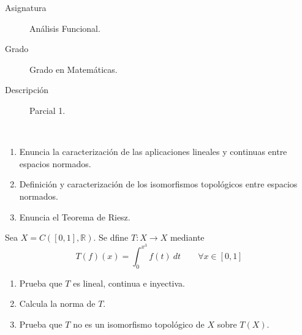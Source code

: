 \documentclass[12pt]{article}
\begin{document}

    
    

    \begin{description}
        \item[Asignatura] Análisis Funcional.
        \item[Grado] Grado en Matemáticas.
        \item[Descripción] Parcial 1.
    
    \end{description}
    \newpage


    
    \begin{ejercicio}[3 puntos]~
        \begin{enumerate}[label=\alph*)]
            \item Enuncia la caracterización de las aplicaciones lineales y continuas entre espacios normados.
            \item Definición y caracterización de los isomorfismos topológicos entre espacios normados.
            \item Enuncia el Teorema de Riesz.
        \end{enumerate}
    \end{ejercicio}

    \begin{ejercicio}[4 puntos]
        Sea $X=C([0,1],\mathbb{R})$. Se dfine $T:X\to X$ mediante
        \begin{equation*}
            T(f)(x) = \int_{0}^{x^3} f(t)~dt  \qquad \forall x\in [0,1]
        \end{equation*}
        \begin{enumerate}[label=\alph*)]
            \item Prueba que $T$ es lineal, continua e inyectiva.
            \item Calcula la norma de $T$.
            \item Prueba que $T$ no es un isomorfismo topológico de $X$ sobre $T(X)$.
        \end{enumerate}
    \end{ejercicio}
\end{document}
